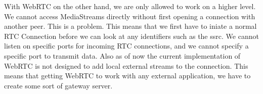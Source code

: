With WebRTC on the other hand, we are only allowed to work on a higher level. We cannot access MediaStreams directly without first opening a connection with another peer. This is a problem. This means that we first have to iniate a normal RTC Connection before we can look at any identifiers such as the \gls{ssrc}. We cannot listen on specific ports for incoming RTC connections, and we cannot specify a specific port to transmit data. Also as of now the current implementation of WebRTC is not designed to add local external streams to the connection. This means that getting WebRTC to work with any external application, we have to create some sort of gateway server.